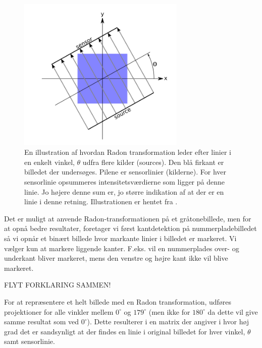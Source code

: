\begin{figure}[htp]
  \centering
  \includegraphics[width=8cm]{system/illu/radon.png}
  \caption{En illustration af hvordan Radon transformation leder efter linier i en enkelt vinkel, $\theta$ udfra flere kilder (sources). Den blå firkant er billedet der undersøges. Pilene er sensorlinier (kilderne). For hver sensorlinie opsummeres intensitetsværdierne som ligger på denne linie. Jo højere denne sum er, jo større indikation af at der er en linie i denne retning. Illustrationen er hentet fra \cite{matlab_radon}.}
  \label{fig:radon_transform}
\end{figure}

Det er muligt at anvende {Radon}-transformationen på et gråtonebillede, men for at opnå bedre resultater, foretager vi først kantdetektion på nummerpladebilledet så vi opnår et binært billede hvor markante linier i billedet er markeret. Vi vælger kun at markere liggende kanter. F.eks. vil en nummerplades over- og underkant bliver markeret, mens den venstre og højre kant ikke vil blive markeret. 

FLYT FORKLARING SAMMEN!

For at repræsentere et helt billede med en Radon transformation, udføres projektioner for alle vinkler mellem $0^{\circ}$ og $179^{\circ}$ (men ikke for $180^{\circ}$ da dette vil give samme resultat som ved $0^{\circ}$). Dette resulterer i en matrix der angiver i hvor høj grad det er sandsynligt at der findes en linie i original billedet for hver vinkel, $\theta$ samt sensorlinie. %


